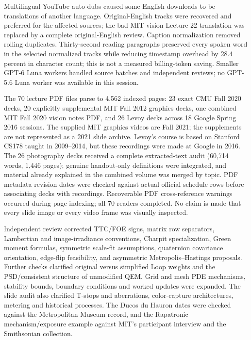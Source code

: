 Multilingual YouTube auto-dubs caused some English downloads to be translations of another language. Original-English tracks were recovered and preferred for the affected sources; the bad MIT vision Lecture 22 translation was replaced by a complete original-English review. Caption normalization removed rolling duplicates. Thirty-second reading paragraphs preserved every spoken word in the selected normalized tracks while reducing timestamp overhead by 28.4 percent in character count; this is not a measured billing-token saving. Smaller GPT-6 Luna workers handled source batches and independent reviews; no GPT-5.6 Luna worker was available in this session.

The 70 lecture PDF files parse to 4,562 indexed pages: 23 exact CMU Fall 2020 decks, 20 explicitly supplemental MIT Fall 2012 graphics decks, one combined MIT Fall 2020 vision notes PDF, and 26 Levoy decks across 18 Google Spring 2016 sessions. The supplied MIT graphics videos are Fall 2021; the supplements are not represented as a 2021 slide archive. Levoy's course is based on Stanford CS178 taught in 2009--2014, but these recordings were made at Google in 2016. The 26 photography decks received a complete extracted-text audit (60,714 words, 1,446 pages); genuine handout-only definitions were integrated, and material already explained in the combined volume was merged by topic. PDF metadata revision dates were checked against actual official schedule rows before associating decks with recordings. Recoverable PDF cross-reference warnings occurred during page indexing; all 70 readers completed. No claim is made that every slide image or every video frame was visually inspected.

Independent review corrected TTC/FOE signs, matrix row separators, Lambertian and image-irradiance conventions, Charpit specialization, Green moment formulas, symmetric scale-fit assumptions, quaternion covariance orientation, edge-flip feasibility, and asymmetric Metropolis--Hastings proposals. Further checks clarified original versus simplified Loop weights and the PSD/consistent structure of unmodified QEM. Grid and mesh PDE mechanisms, stability bounds, boundary conditions and worked updates were expanded. The slide audit also clarified T-stops and aberrations, color-capture architectures, metering and historical processes. The Ducos du Hauron dates were checked against the Metropolitan Museum record, and the Rapatronic mechanism/exposure example against MIT's participant interview and the Smithsonian collection.

